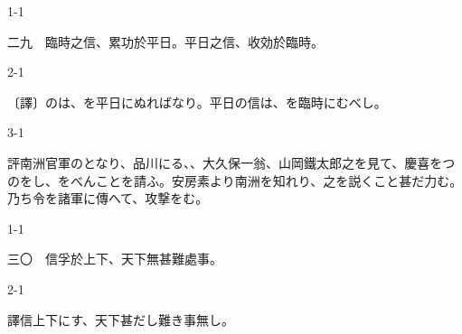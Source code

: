 \documentclass[tate,paper=b6j,jafontsize=9pt]{jlreq}
\begin{document}
\begin{azconvIndented}{1\zw}{-1\zw}

二九　臨時之信、累功於平日。平日之信、收効於臨時。

\end{azconvIndented}
\begin{azconvIndented}{2\zw}{-1\zw}

〔譯〕のは、を平日にぬればなり。平日の信は、を臨時にむべし。

\end{azconvIndented}
\begin{azconvIndented}{3\zw}{-1\zw}

評南洲官軍のとなり、品川にる、、大久保一翁、山岡鐵太郎之を見て、慶喜をつのをし、をべんことを請ふ。安房素より南洲を知れり、之を説くこと甚だ力む。乃ち令を諸軍に傳へて、攻撃をむ。

\end{azconvIndented}

\begin{azconvIndented}{1\zw}{-1\zw}

三〇　信孚於上下、天下無甚難處事。

\end{azconvIndented}
\begin{azconvIndented}{2\zw}{-1\zw}

譯信上下にす、天下甚だし難き事無し。

\end{azconvIndented}
\end{document}

